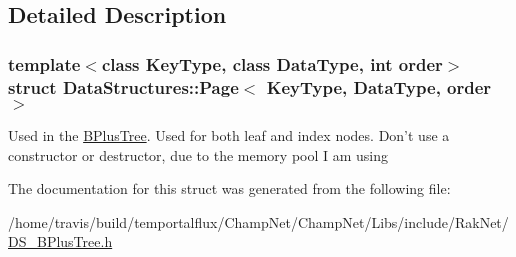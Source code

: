 \subsection{Detailed Description}
\subsubsection*{template$<$class Key\-Type, class Data\-Type, int order$>$struct Data\-Structures\-::\-Page$<$ Key\-Type, Data\-Type, order $>$}

Used in the \hyperlink{class_data_structures_1_1_b_plus_tree}{B\-Plus\-Tree}. Used for both leaf and index nodes. Don't use a constructor or destructor, due to the memory pool I am using 

The documentation for this struct was generated from the following file\-:\begin{DoxyCompactItemize}
\item 
/home/travis/build/temportalflux/\-Champ\-Net/\-Champ\-Net/\-Libs/include/\-Rak\-Net/\hyperlink{_d_s___b_plus_tree_8h}{D\-S\-\_\-\-B\-Plus\-Tree.\-h}\end{DoxyCompactItemize}
